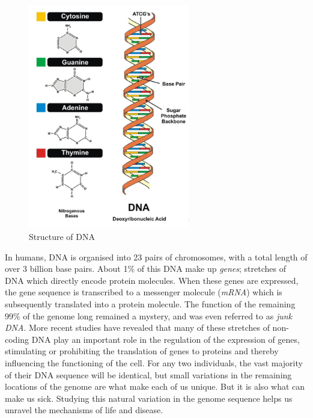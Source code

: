 \begin{figure}
    \centering
    \includegraphics[width=200pt]{chapters/images/introduction/dna-structure.png}
    \caption{Structure of DNA}
    \label{fig:dnastructure}
\end{figure}

In humans, DNA is organised into 23 pairs of chromosomes, with a total length of over 3 billion base pairs. About 1\% of this DNA make up \emph{genes}; stretches of DNA which directly encode protein molecules. When these genes are expressed, the gene sequence is transcribed to a messenger molecule (\emph{mRNA}) which is subsequently translated into a protein molecule. The function of the remaining 99\% of the genome long remained a mystery, and was even referred to as \emph{junk DNA}. More recent studies have revealed that many of these stretches of non-coding DNA play an important role in the regulation of the expression of genes, stimulating or prohibiting the translation of genes to proteins and thereby influencing the functioning of the cell. For any two individuals, the vast majority of their DNA sequence will be identical, but small variations in the remaining locations of the genome are what make each of us unique. But it is also what can make us sick. Studying this natural variation in the genome sequence helps us unravel the mechanisms of life and disease.

